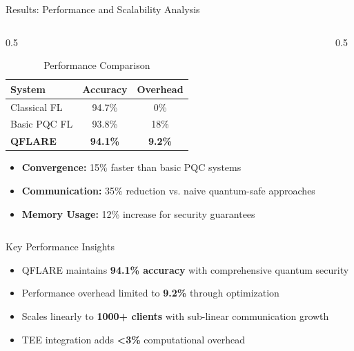 \documentclass[aspectratio=169,11pt]{beamer}
\newcommand{\highlight}[1]{\textcolor{qflareblue}{\textbf{#1}}}
\begin{document}
\begin{frame}{Results: Performance and Scalability Analysis}

\begin{columns}
\begin{column}{0.5\textwidth}
\begin{table}[h]
\centering
\footnotesize
\caption{Performance Comparison}
\begin{tabular}{@{}lcc@{}}
\toprule
\textbf{System} & \textbf{Accuracy} & \textbf{Overhead} \\
\midrule
Classical FL & 94.7\% & 0\% \\
Basic PQC FL & 93.8\% & 18\% \\
\textbf{QFLARE} & \textbf{94.1\%} & \textbf{9.2\%} \\
\bottomrule
\end{tabular}
\end{table}

\begin{itemize}
\item \textbf{Convergence:} 15\% faster than basic PQC systems
\item \textbf{Communication:} 35\% reduction vs. naive quantum-safe approaches
\item \textbf{Memory Usage:} 12\% increase for security guarantees
\end{itemize}
\end{column}

\begin{column}{0.5\textwidth}
\end{column}
\end{columns}

\begin{block}{Key Performance Insights}
\begin{itemize}
\item QFLARE maintains \highlight{94.1\% accuracy} with comprehensive quantum security
\item Performance overhead limited to \highlight{9.2\%} through optimization
\item Scales linearly to \highlight{1000+ clients} with sub-linear communication growth
\item TEE integration adds \highlight{<3\%} computational overhead
\end{itemize}
\end{block}


\end{frame}
\end{document}
